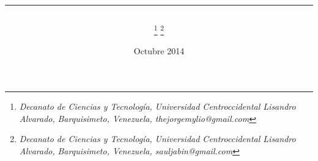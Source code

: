 \documentclass[11pt,twoside,A5]{article}
\begin{document}
\title{
\vspace{-1.1in}
\begin{flushleft}
{\normalsize \begin{center}
\end{center}}
\end{flushleft}
\hrule \vspace{0.5in}{ARQUITECTURA HÍBRIDA DE NAVEGACIÓN PARA ROBOT PIONEER PD3X} }

\author{ 
\footnote{  {\it\scriptsize  Decanato de Ciencias y Tecnolog\'ia,} 
{\it\scriptsize Universidad Centroccidental Lisandro Alvarado,}
{\it\scriptsize Barquisimeto, Venezuela, thejorgemylio@gmail.com}
}\hspace{1mm}{Jorge Parra}
 \hspace{3mm} 
\footnote{  {\it\scriptsize  Decanato de Ciencias y Tecnolog\'ia,} 
{\it\scriptsize Universidad Centroccidental Lisandro Alvarado,}
{\it\scriptsize Barquisimeto, Venezuela, sauljabin@gmail.com}
}\hspace{1mm}{ Saúl Piña} \\
}

\date{\small{Octubre 2014}
}
\end{document}
